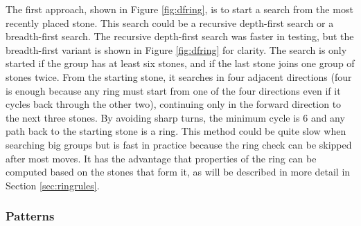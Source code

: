 The first approach, shown in Figure \ref{fig:dfring}, is to start a search from the most recently placed stone. This search could be a recursive depth-first search or a breadth-first search. The recursive depth-first search was faster in testing, but the breadth-first variant is shown in Figure \ref{fig:dfring} for clarity. The search is only started if the group has at least six stones, and if the last stone joins one group of stones twice. From the starting stone, it searches in four adjacent directions (four is enough because any ring must start from one of the four directions even if it cycles back through the other two), continuing only in the forward direction to the next three stones. By avoiding sharp turns, the minimum cycle is 6 and any path back to the starting stone is a ring. This method could be quite slow when searching big groups but is fast in practice because the ring check can be skipped after most moves. It has the advantage that properties of the ring can be computed based on the stones that form it, as will be described in more detail in Section \ref{sec:ringrules}.


\subsubsection{Patterns}

